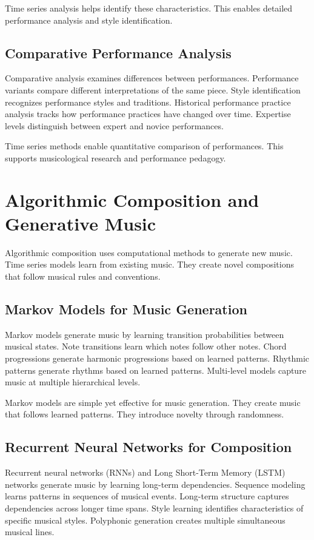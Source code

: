 Time series analysis helps identify these characteristics. This enables detailed performance analysis and style identification.

\subsection{Comparative Performance Analysis}

Comparative analysis examines differences between performances. Performance variants compare different interpretations of the same piece. Style identification recognizes performance styles and traditions. Historical performance practice analysis tracks how performance practices have changed over time. Expertise levels distinguish between expert and novice performances.

Time series methods enable quantitative comparison of performances. This supports musicological research and performance pedagogy.

\section{Algorithmic Composition and Generative Music}

Algorithmic composition uses computational methods to generate new music. Time series models learn from existing music. They create novel compositions that follow musical rules and conventions.

\subsection{Markov Models for Music Generation}

Markov models generate music by learning transition probabilities between musical states. Note transitions learn which notes follow other notes. Chord progressions generate harmonic progressions based on learned patterns. Rhythmic patterns generate rhythms based on learned patterns. Multi-level models capture music at multiple hierarchical levels.

Markov models are simple yet effective for music generation. They create music that follows learned patterns. They introduce novelty through randomness.

\subsection{Recurrent Neural Networks for Composition}

Recurrent neural networks (RNNs) and Long Short-Term Memory (LSTM) networks generate music by learning long-term dependencies. Sequence modeling learns patterns in sequences of musical events. Long-term structure captures dependencies across longer time spans. Style learning identifies characteristics of specific musical styles. Polyphonic generation creates multiple simultaneous musical lines.

